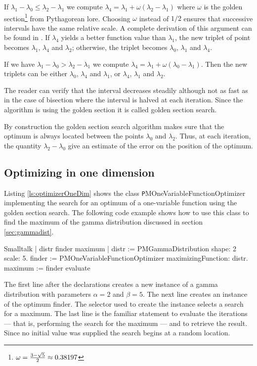 If $\lambda_1-\lambda_0\leq\lambda_2-\lambda_1$ we compute
$\lambda_4 =\lambda_1 + \omega\left(\lambda_2-\lambda_1\right)$
where $\omega$ is the golden
section\footnote{$\omega={3-\sqrt{5}\over 2}\approx0.38197$} from
Pythagorean lore. Choosing $\omega$ instead of $1/2$ ensures that
successive intervals have the same relative scale. A complete
derivation of this argument can be found in \cite{Press}. If
$\lambda_4$ yields a better function value than $\lambda_1$, the
new triplet of point becomes $\lambda_1$, $\lambda_4$ and
$\lambda_2$; otherwise, the triplet becomes $\lambda_0$,
$\lambda_1$ and $\lambda_4$.

If we have $\lambda_1-\lambda_0>\lambda_2-\lambda_1$ we compute
$\lambda_4 =\lambda_1 + \omega\left(\lambda_0-\lambda_1\right)$.
Then the new triplets can be either $\lambda_0$, $\lambda_4$ and
$\lambda_1$, or $\lambda_4$, $\lambda_1$ and $\lambda_2$.

The reader can verify that the interval decreases steadily
although not as fast as in the case of bisection where the
interval is halved at each iteration.
Since the algorithm is using the golden section it is called golden section search.

By construction the golden section search algorithm makes sure
that the optimum is always located between the points $\lambda_0$
and $\lambda_2$. Thus, at each iteration, the quantity
$\lambda_2-\lambda_0$ give an estimate of the error on the
position of the optimum.

\subsection{Optimizing in one dimension}
Listing \ref{ls:optimizerOneDim} shows the class {\texttt
PMOneVariableFunctionOptimizer} implementing the search for an
optimum of a one-variable function using the golden section
search.
The following code example shows how to use this class to
find the maximum of the gamma distribution discussed in section
\ref{sec:gammadist}.

\begin{displaycode}{Smalltalk}
| distr finder maximum |
   distr := PMGammaDistribution shape: 2 scale: 5.
   finder := PMOneVariableFunctionOptimizer maximizingFunction: distr.
   maximum := finder evaluate
\end{displaycode}

The first line after the declarations creates a new instance of a
gamma distribution with parameters $\alpha = 2$ and $\beta = 5$.
The next line creates an instance of the optimum finder. The
selector used to create the instance selects a search for a
maximum. The last line is the familiar statement to evaluate the
iterations --- that is, performing the search for the maximum ---
and to retrieve the result. Since no initial value was supplied
the search begins at a random location.

